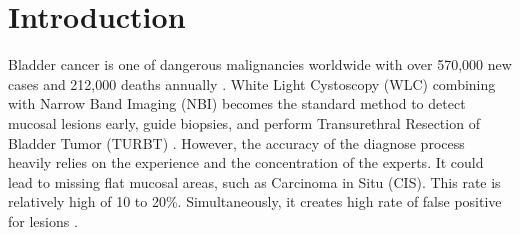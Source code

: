 \documentclass[runningheads]{llncs}
\begin{document}
\begin{abstract}
(Accuracy 0,8100 vs 0,7601). Bản đồ nhiệt Grad-CAM cải thiện độ trùng khớp IoU giải phẫu từ 0,0500 lên 0,2356 trên mặt nạ chuyên gia, đồng thời đạt thông lượng suy luận thời gian thực 66,7 FPS end-to-end trên phần cứng biên, chứng minh tính khả thi của phương pháp học phân cấp dài đuôi cho chẩn đoán nội soi bàng quang.

\end{abstract}
%
%
%
\section{Introduction}
\label{sec:intro}

Bladder cancer is one of dangerous malignancies worldwide with over 570,000 new cases and 212,000 deaths annually \cite{ref_lee2026cystods,ref_shkolyar2019augmented}.
White Light Cystoscopy (WLC) combining with Narrow Band Imaging (NBI) becomes the standard method to detect mucosal lesions early, guide biopsies, and perform Transurethral Resection of Bladder Tumor (TURBT) \cite{ref_wu2022multicenter,ref_wang2026narrowband}.
However, the accuracy of the diagnose process heavily relies on the experience and the concentration of the experts.
It could lead to missing flat mucosal areas, such as Carcinoma in Situ (CIS).
This rate is relatively high of 10 to 20\%.
Simultaneously, it creates high rate of false positive for lesions \cite{ref_shkolyar2019augmented,ref_zhang2026multiarch}.

\end{document}

